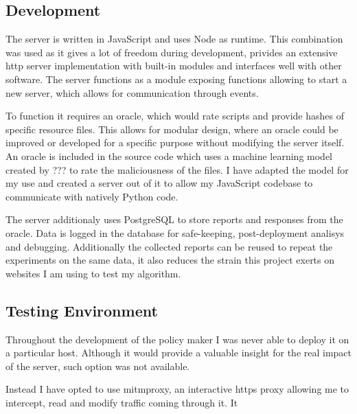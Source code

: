 \subsection{Development}

The server is written in JavaScript and uses Node as runtime.
This combination was used as it gives a lot of freedom during development, privides an extensive http server implementation with built-in modules and interfaces well with other software.
The server functions as a module exposing functions allowing to start a new server, which allows for communication through events.

To function it requires an oracle, which would rate scripts and provide hashes of specific resource files.
This allows for modular design, where an oracle could be improved or developed for a specific purpose without modifying the server itself.
An oracle is included in the source code which uses a machine learning model created by ??? to rate the maliciousness of the files.
I have adapted the model for my use and created a server out of it to allow my JavaScript codebase to communicate with natively Python code.

The server additionaly uses PostgreSQL to store reports and responses from the oracle.
Data is logged in the database for safe-keeping, post-deployment analisys and debugging.
Additionally the collected reports can be reused to repeat the experiments on the same data, it also reduces the strain this project exerts on websites I am using to test my algorithm.


\subsection{Testing Environment}

Throughout the development of the policy maker I was never able to deploy it on a particular host.
Although it would provide a valuable insight for the real impact of the server, such option was not available.

Instead I have opted to use mitmproxy, an interactive https proxy allowing me to intercept, read and modify traffic coming through it.
It

